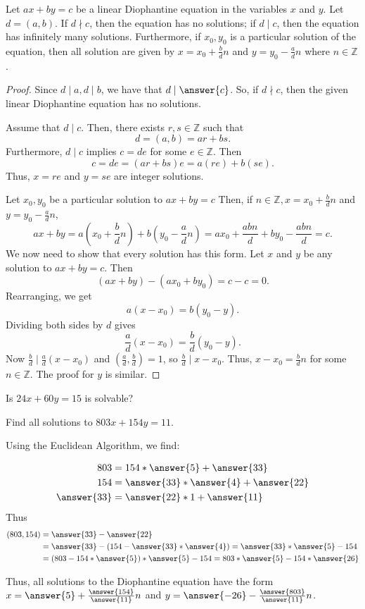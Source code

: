 \documentclass{ximera}
\begin{document}
\begin{theorem}
 Let $ax+by=c$ be a linear Diophantine equation in the variables $x$ and $y$. Let $d=(a,b)$. If $d\nmid c$, then the equation has no solutions; if $d\mid c$, then the equation has infinitely many solutions. Furthermore, if $x_0,y_0$ is a particular solution of the equation, then all solution are given by $x=x_0+\frac{b}{d}n$ and $y=y_0-\frac{a}{d}n$ where $n\in\mathbb{Z}$.
\end{theorem}
\begin{proof}
 Since $d\mid a,d\mid b$, we have that $d\mid\answer{c}
 $. So, if $d\nmid c$, then the given linear Diophantine equation has no solutions. 
 
 Assume that $d\mid c$. Then, there exists $r,s\in\mathbb{Z}$ such that \[d=(a,b)=ar+bs.\] Furthermore, $d\mid c$ implies $c=de$ for some $e\in\mathbb{Z}$. Then \[c=de=(ar+bs)e=a(re)+b(se).\] 
 Thus, $x=re$ and $y=se$ are integer solutions.
 
 Let $x_0,y_0$ be a particular solution to $ax+by=c$ Then, if $n\in\mathbb{Z}, x=x_0+\frac{b}{d}n$ and $y=y_0-\frac{a}{d}n$, \[ax+by=a(x_0+\frac{b}{d}n)+b(y_0-\frac{a}{d}n)=ax_0+\frac{abn}{d}+by_0-\frac{abn}{d}=c.\] We now need to show that every solution has this form.  Let $x$ and $y$ be any solution to $ax+by=c$. Then \[(ax+by)-(ax_0+by_0)=c-c=0.\] Rearranging, we get \[a(x-x_0)=b(y_0-y).\] Dividing both sides by $d$ gives \[\frac{a}{d}(x-x_0)=\frac{b}{d}(y_0-y).\] Now $\frac{b}{d}\mid \frac{a}{d}(x-x_0)$ and $(\frac{a}{d},\frac{b}{d})=1$, so $\frac{b}{d}\mid x-x_0$. Thus, $x-x_0=\frac{b}{d}n$ for some $n\in\mathbb{Z}$. The proof for $y$ is similar.
\end{proof}

\begin{example}
Is $24x+60y=15$ is solvable?
\begin{multipleChoice}
\end{multipleChoice}
\end{example}

\begin{example}
Find all solutions to $803x+154y=11$.

Using the Euclidean Algorithm, we find:
 
\begin{align*}
 803&=154*\answer{5}+\answer{33}\\
 154&=\answer{33}*\answer{4}+\answer{22}\\
 \answer{33}&=\answer{22}*1+\answer{11}
\end{align*}
Thus
\begin{align*}
 (803,154)&=\answer{33}-\answer{22}\\
 &=\answer{33}-(154-\answer{33}*\answer{4})=\answer{33}*\answer{5}-154\\
 &=(803-154*\answer{5})*\answer{5}-154=803*\answer{5}-154*\answer{26}
\end{align*}

Thus, all solutions to the Diophantine equation have the form $x=\answer{5}+\frac{\answer{154}}{\answer{11}}n$ and $y=\answer{-26}-\frac{\answer{803}}{\answer{11}}n$.
\end{example}
\end{document}
